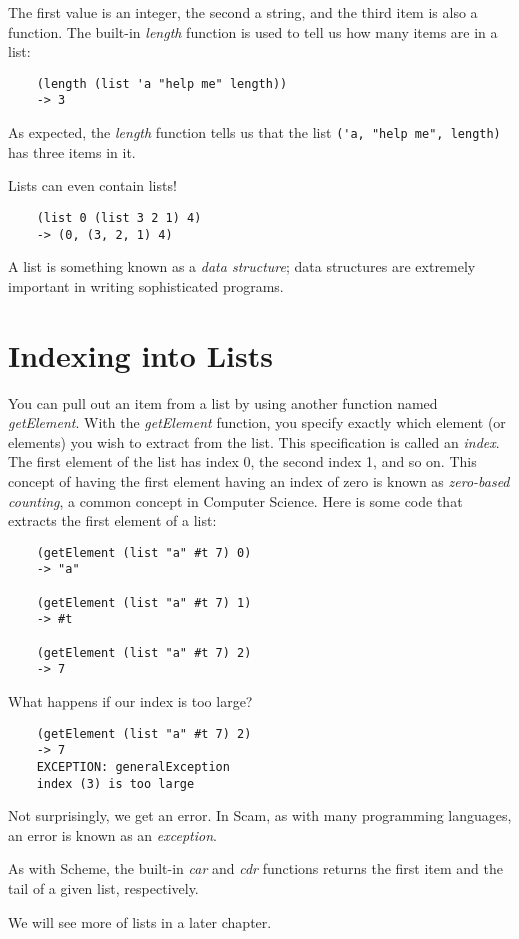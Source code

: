 The first value is an integer, the second a string,
and the third item is also a function. 
The built-in {\it length} function
is used to tell us how many items are in a list:

\begin{verbatim}
    (length (list 'a "help me" length))
    -> 3
\end{verbatim}

As expected, the {\it length} function tells us that the list
\verb!('a, "help me", length)! has three items in it.

Lists can even contain lists!

\begin{verbatim}
    (list 0 (list 3 2 1) 4)
    -> (0, (3, 2, 1) 4)
\end{verbatim}

A list is something known as a {\it data structure};
data structures are extremely important in writing
sophisticated programs.

\section{Indexing into Lists}

You can pull out an item from a list by using another function
named {\it getElement}.
With the {\it getElement} function,
you specify exactly which element (or elements)
you wish to extract from the list. This specification is called an
{\it index}. The first element of the list has index 0, the second
index 1, and so on. This concept of having the first element having
an index of zero is known as {\it zero-based counting}, a common concept
in Computer Science. Here is some code that extracts the first element
of a list:

\begin{verbatim}
    (getElement (list "a" #t 7) 0)
    -> "a"

    (getElement (list "a" #t 7) 1)
    -> #t

    (getElement (list "a" #t 7) 2)
    -> 7
\end{verbatim}

What happens if our index is too large?

\begin{verbatim}
    (getElement (list "a" #t 7) 2)
    -> 7
    EXCEPTION: generalException
    index (3) is too large
\end{verbatim}

Not surprisingly, we get an error.
In Scam, as with many programming languages, an error is known
as an {\it exception}.

As with Scheme, the built-in {\it car} and {\it cdr} functions
returns the first item and the tail of a given list, respectively.

We will see more of lists in a later chapter.
